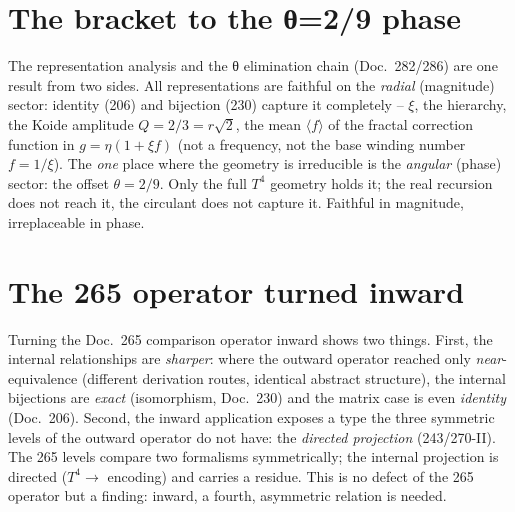 \section{The bracket to the θ=2/9 phase}
The representation analysis and the θ elimination chain (Doc.~282/286) are one result from two sides.
All representations are faithful on the \emph{radial} (magnitude) sector: identity (206) and
bijection (230) capture it completely -- $\xi$, the hierarchy, the Koide amplitude $Q=2/3=r\sqrt2$,
the mean $\langle f\rangle$ of the fractal correction function in $g=\eta(1+\xi f)$ (not a frequency, not
the base winding number $f=1/\xi$). The \emph{one} place where the geometry is irreducible is the
\emph{angular} (phase) sector: the offset $\theta=2/9$. Only the full $T^4$ geometry holds it; the
real recursion does not reach it, the circulant does not capture it. Faithful in magnitude,
irreplaceable in phase.

\section{The 265 operator turned inward}\label{sec:inward}
Turning the Doc.~265 comparison operator inward shows two things. First, the internal relationships are
\emph{sharper}: where the outward operator reached only \emph{near}-equivalence (different derivation
routes, identical abstract structure), the internal bijections are \emph{exact} (isomorphism,
Doc.~230) and the matrix case is even \emph{identity} (Doc.~206). Second, the inward application
exposes a type the three symmetric levels of the outward operator do not have: the \emph{directed
projection} (243/270-II). The 265 levels compare two formalisms symmetrically; the internal projection
is directed ($T^4 \to$ encoding) and carries a residue. This is no defect of the 265 operator but a
finding: inward, a fourth, asymmetric relation is needed.

